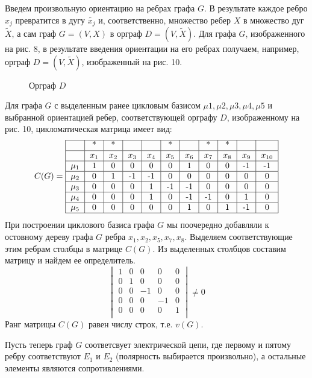 \documentclass[12pt, letterpaper, titlepage]{article}
\begin{document}
Введем произвольную ориентацию на ребрах графа $G$. В результате каждое ребро $x_j$ превратится
в дугу $\tilde{x_j}$ и, соответственно, множество ребер $X$ в множество дуг $\widetilde{X}$,
а сам граф $G=(V,X)$ в орграф $D=(V,\widetilde{X})$. Для графа $G$, изображенного на рис. 8,
в результате введения ориентации на его ребрах получаем, например, орграф $D=(V, \widetilde{X})$,
изображенный на рис. 10.
\begin{figure}[H]\centering\caption{Орграф $D$}\end{figure}
Для графа $G$ с выделенным ранее цикловым базисом $\mu1,\mu2,\mu3,\mu4,\mu5$ и выбранной ориентацией ребер,
соответствующей орграфу $D$, изображенному на рис. 10, цикломатическая матрица имеет вид:
\[
C(G)=
\begin{tabular}{|c|c|c|c|c|c|c|c|c|c|c|}
    \hline
    &*&*&&&*&&*&*&&\\
    \hline
    & $x_1$ & $x_2$ & $x_3$ & $x_4$ & $x_5$ & $x_6$ & $x_7$ & $x_8$ & $x_9$ & $x_{10}$\\
    \hline
    $\mu_1$ & 1 & 0 & 0 & 0 & 0 & 1 & 0 & 0 & -1 & -1 \\
    \hline
    $\mu_2$ & 0 & 1 & -1 & -1 & 0 & 0 & 0 & 0& 0& 0\\
    \hline
    $\mu_3$ & 0 & 0 & 0 & 1 & -1 & -1 & 0& 0& 0& 0 \\
    \hline
    $\mu_4$ & 0 & 0 & 0 & 1 & 0 & -1 & -1&0& 1& 0 \\
    \hline
    $\mu_5$ & 0 & 0 & 0 & 0 & 0 & 1 & 0 &1& -1& 0 \\
    \hline
\end{tabular}
\]
При построении циклового базиса графа $G$ мы поочередно добавляли к остовному дереву
графа $G$ ребра $x_1,x_2,x_5,x_7,x_8$. Выделяем соответствующие этим ребрам столбцы
в матрице $C(G)$. Из выделенных столбцов составим матрицу и найдем ее определитель.
\[
    \begin{vmatrix}
    1&0&0&0&0\\
    0&1&0&0&0\\
    0&0&-1&0&0\\
    0&0&0&-1&0\\
    0&0&0&0&1\\
    \end{vmatrix}
    \neq0
\]
Ранг матрицы $C(G)$ равен числу строк, т.е. $v(G)$.

Пусть теперь граф $G$ соответсвует электрической цепи, где первому и пятому ребру соответствуют
$E_1$ и $E_2$ (полярность выбирается произвольно), а остальные элементы являются сопротивлениями.
\end{document}
